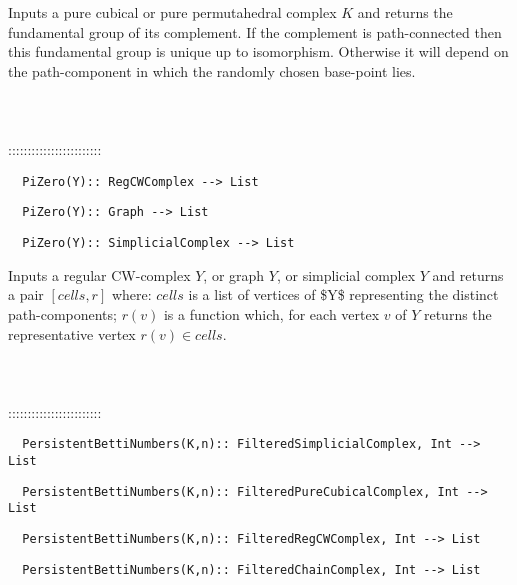 \documentclass[a4paper,11pt]{report}
\begin{document}
{ 

 Inputs a pure cubical or pure permutahedral complex $K$ and returns the fundamental group of its complement. If the complement is
path-connected then this fundamental group is unique up to isomorphism.
Otherwise it will depend on the path-component in which the randomly chosen
base-point lies. \\
 \\
 \\
 \\
 ::::::::::::::::::::::::\\
 
\begin{verbatim}  PiZero(Y):: RegCWComplex --> List
\end{verbatim}
 
\begin{verbatim}  PiZero(Y):: Graph --> List
\end{verbatim}
 
\begin{verbatim}  PiZero(Y):: SimplicialComplex --> List
\end{verbatim}


 

 Inputs a regular CW-complex $Y$, or graph $Y$, or simplicial complex $Y$ and returns a pair $[cells,r]$ where: $cells$ is a list of vertices of \$Y\$ representing the distinct path-components; $r(v)$ is a function which, for each vertex $v$ of $Y$ returns the representative vertex $r(v) \in cells$. \\
 \\
 \\
 \\
 ::::::::::::::::::::::::\\
 
\begin{verbatim}  PersistentBettiNumbers(K,n):: FilteredSimplicialComplex, Int --> List
\end{verbatim}
 
\begin{verbatim}  PersistentBettiNumbers(K,n):: FilteredPureCubicalComplex, Int --> List
\end{verbatim}
 
\begin{verbatim}  PersistentBettiNumbers(K,n):: FilteredRegCWComplex, Int --> List
\end{verbatim}
 
\begin{verbatim}  PersistentBettiNumbers(K,n):: FilteredChainComplex, Int --> List
\end{verbatim}
 
}
\end{document}

